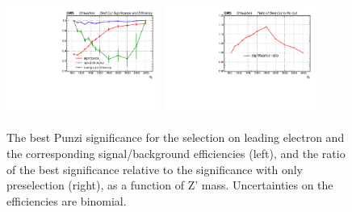 \begin{figure}[htbp]
   \centering
   \includegraphics[width=0.45\textwidth]{optimization/plot_1st_pt/plot_1st_pt_best_cut_significance_and_efficiency.pdf}
   \includegraphics[width=0.45\textwidth]{optimization/plot_1st_pt/plot_1st_pt_significance_ratio_of_best_cut_to_no_cut.pdf}
   \caption{The best Punzi significance for the selection on 
leading electron \pt and the corresponding signal/background 
efficiencies (left), and the ratio of the best significance 
relative to the significance with only preselection (right),  as a function 
of Z' mass. Uncertainties on the efficiencies are binomial.}
  \label{fig:leadptmass}
\end{figure}



